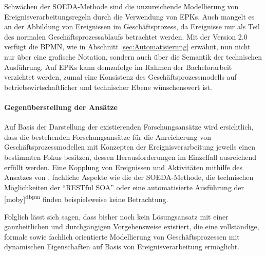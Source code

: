 Schwächen der SOEDA-Methode sind die unzureichende Modellierung von Ereignisverarbeitungsregeln durch die Verwendung von \ac{EPK}s. 
\cite{RobraBissantz.2009}
Auch mangelt es an der Abbildung von Ereignissen im Geschäftsprozess, da Ereignisse nur als Teil des normalen Geschäftsprozessablaufs betrachtet werden. Mit der Version 2.0 verfügt die \ac{BPMN}, wie in Abschnitt \ref{sec:Automatisierung} erwähnt, nun nicht nur über eine grafische Notation, sondern auch über die Semantik der technischen Ausführung. Auf \ac{EPK}s kann demzufolge im Rahmen der Bachelorarbeit verzichtet werden, zumal eine Konsistenz des Geschäftsprozessmodells auf betriebswirtschaftlicher und technischer Ebene wünschenswert ist.

\paragraph{Gegenüberstellung der Ansätze}
Auf Basis der Darstellung der existierenden Forschungsansätze wird ersichtlich, dass die bestehenden Forschungsansätze für die Anreicherung von Geschäftsprozessmodellen mit Konzepten der Ereignisverarbeitung jeweils einen bestimmten Fokus besitzen, dessen Herausforderungen im Einzelfall ausreichend erfüllt werden. 
Eine Kopplung von Ereignissen und Aktivitäten mithilfe des Ansatzes von \citeauthor{Alexopoulou.2008}, fachliche Aspekte wie die der SOEDA-Methode, die technischen Möglichkeiten der \enquote{RESTful SOA} oder eine automatisierte Ausführung der [moby]\textsuperscript{dbpm} finden beispielsweise keine Betrachtung. 

Folglich lässt sich sagen, dass bisher noch kein Lösungsansatz mit einer ganzheitlichen und durchgängigen Vorgehensweise existiert, die eine vollständige, formale sowie fachlich orientierte Modellierung von Geschäftsprozessen mit dynamischen Eigenschaften auf Basis von Ereignisverarbeitung ermöglicht.

